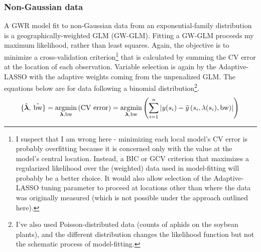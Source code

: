 \documentclass[authoryear ,review]{elsarticle}
\DeclareMathOperator*{\argmin}{\arg\!\min}
\DeclareMathOperator*{\bw}{\mbox{bw}}
\newcommand{\vect}[1]{\boldsymbol{#1}}
\begin{document}
		\subsubsection{Non-Gaussian data} 
		A GWR model fit to non-Gaussian data from an exponential-family distribution is a geographically-weighted GLM (GW-GLM). Fitting a GW-GLM proceeds my maximum likelihood, rather than least squares. Again, the objective is to minimize a cross-validation criterion\footnote{I suspect that I am wrong here - minimizing each local model's CV error is probably overfitting because it is concerned only with the value at the model's central location. Instead, a BIC or GCV criterion that maximizes a regularized likelihood over the (weighted) data used in model-fitting will probably be a better choice. It would also allow selection of the Adaptive-LASSO tuning parameter to proceed at locations other than where the data was originally measured (which is not possible under the approach outlined here).} that is calculated by summing the CV error at the location of each observation. Variable selection is again by the Adaptive-LASSO with the adaptive weights coming from the unpenalized GLM. The equations below are for data following a binomial distribution\footnote{I've also used Poisson-distributed data (counts of aphids on the soybean plants), and the different distribution changes the likelihood function but not the schematic process of model-fitting.}.\\
		\[
			\{ \hat{\vect{\lambda}}, \: \hat{\bw} \} = \argmin_{\vect{\lambda}, \text{bw}} \left( \mbox{CV error} \right)  = \argmin_{\vect{\lambda}, \text{bw}} \left( \sum_{i = 1}^n \left| y(s_i)-\tilde{y} \left(s_i, \lambda(s_i), \bw \right) \right| \right)\\
		\]	
		
\end{document}
